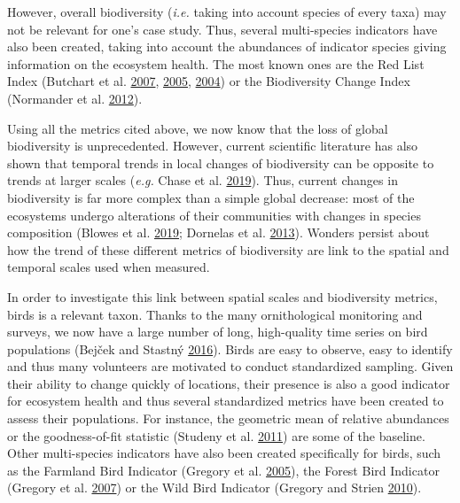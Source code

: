 \documentclass[
  12pt,
  oneside]{report}
\begin{document}
However, overall biodiversity (\emph{i.e.} taking into account species of every taxa) may not be relevant for one's case study. Thus, several multi-species indicators have also been created, taking into account the abundances of indicator species giving information on the ecosystem health. The most known ones are the Red List Index (Butchart et al. \protect\hyperlink{ref-butchart_improvements_2007}{2007}, \protect\hyperlink{ref-butchart_using_2005}{2005}, \protect\hyperlink{ref-butchart_measuring_2004}{2004}) or the Biodiversity Change Index (Normander et al. \protect\hyperlink{ref-normander_indicator_2012}{2012}).

Using all the metrics cited above, we now know that the loss of global biodiversity is unprecedented. However, current scientific literature has also shown that temporal trends in local changes of biodiversity can be opposite to trends at larger scales (\emph{e.g.} Chase et al. \protect\hyperlink{ref-chase_species_2019}{2019}). Thus, current changes in biodiversity is far more complex than a simple global decrease: most of the ecosystems undergo alterations of their communities with changes in species composition (Blowes et al. \protect\hyperlink{ref-blowes_geography_2019}{2019}; Dornelas et al. \protect\hyperlink{ref-dornelas_quantifying_2013}{2013}). Wonders persist about how the trend of these different metrics of biodiversity are link to the spatial and temporal scales used when measured.

In order to investigate this link between spatial scales and biodiversity metrics, birds is a relevant taxon. Thanks to the many ornithological monitoring and surveys, we now have a large number of long, high-quality time series on bird populations (Bejček and Stastný \protect\hyperlink{ref-bejcek_velke_2016}{2016}). Birds are easy to observe, easy to identify and thus many volunteers are motivated to conduct standardized sampling. Given their ability to change quickly of locations, their presence is also a good indicator for ecosystem health and thus several standardized metrics have been created to assess their populations. For instance, the geometric mean of relative abundances or the goodness-of-fit statistic (Studeny et al. \protect\hyperlink{ref-studeny_goodness_2011}{2011}) are some of the baseline. Other multi-species indicators have also been created specifically for birds, such as the Farmland Bird Indicator (Gregory et al. \protect\hyperlink{ref-gregory_developing_2005}{2005}), the Forest Bird Indicator (Gregory et al. \protect\hyperlink{ref-gregory_population_2007}{2007}) or the Wild Bird Indicator (Gregory and Strien \protect\hyperlink{ref-gregory_wild_2010}{2010}).
\end{document}
